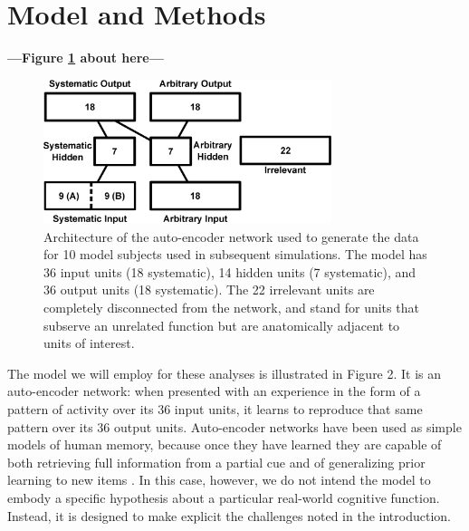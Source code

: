 \section{Model and Methods}

\begin{center}
\textbf{---Figure \ref{fig.model_outline} about here---}
\end{center}

\begin{figure}
\centering
\includegraphics[width=0.75\textwidth]{figures/figure2.eps}
\caption{\label{fig.model_outline} Architecture of the auto-encoder network used to generate the data for 10 model subjects used in subsequent simulations. The model has 36 input units (18 systematic), 14 hidden units (7 systematic), and 36 output units (18 systematic). The 22 irrelevant units are completely disconnected from the network, and stand for units that subserve an unrelated function but are anatomically adjacent to units of interest.}
\end{figure}

The model we will employ for these analyses is illustrated in Figure 2. It is an auto-encoder network: when presented with an experience in the form of a pattern of activity over its 36 input units, it learns to reproduce that same pattern over its 36 output units. Auto-encoder networks have been used as simple models of human memory, because once they have learned they are capable of both retrieving full information from a partial cue and of generalizing prior learning to new items \cite{McClellandRumelhart85}. In this case, however, we do not intend the model to embody a specific hypothesis about a particular real-world cognitive function. Instead, it is designed to make explicit the challenges noted in the introduction. 

